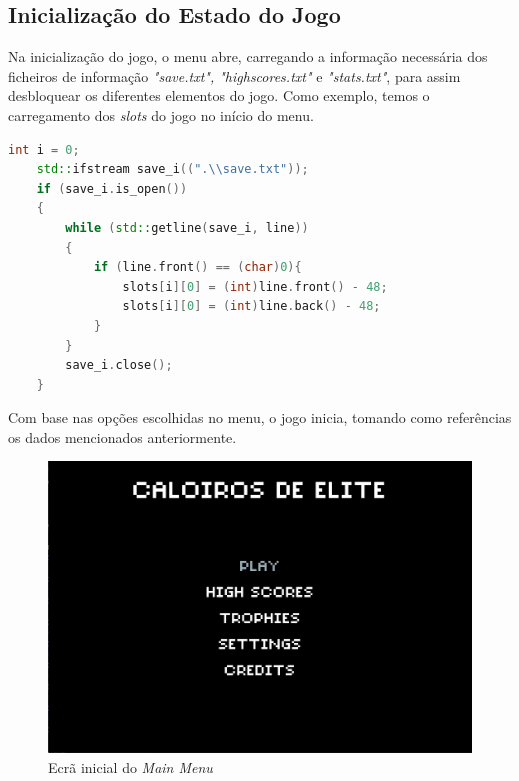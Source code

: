 \documentclass[a4paper,11pt]{article}
\begin{document}
\subsection{Inicialização do Estado do Jogo}

\vspace{8pt}

Na inicialização do jogo, o menu abre, carregando a informação necessária dos ficheiros de informação \textit{"save.txt", "highscores.txt"} e \textit{"stats.txt"}, para assim desbloquear os diferentes elementos do jogo. Como exemplo, temos o carregamento dos \textit{slots} do jogo no início do menu.

\begin{lstlisting}[language = C++]
    int i = 0;
    std::ifstream save_i((".\\save.txt"));
    if (save_i.is_open())
    {
        while (std::getline(save_i, line))
        {
            if (line.front() == (char)0){
                slots[i][0] = (int)line.front() - 48;
                slots[i][0] = (int)line.back() - 48;
            }
        }
        save_i.close();
    }
    \end{lstlisting}

\vspace{8pt}

Com base nas opções escolhidas no menu, o jogo inicia, tomando como referências os dados mencionados anteriormente.

\vspace{8pt}

\begin{figure}[H]
    \centering
    \includegraphics[scale = 0.50]{1 - Imagens/MainMenu.png}
    \caption{Ecrã inicial do \textit{Main Menu}}
    \label{fig:MainMenu}
\end{figure}
\end{document}
